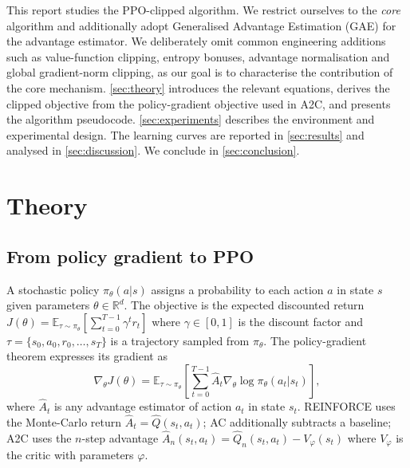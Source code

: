 \documentclass{article}
\theoremstyle{plain}
\theoremstyle{definition}
\theoremstyle{remark}
\begin{document}
This report studies the PPO-clipped algorithm. We restrict ourselves to the \emph{core} algorithm and additionally adopt Generalised Advantage Estimation (GAE) \cite{schulman2016gae} for the advantage estimator. We deliberately omit common engineering additions such as value-function clipping, entropy bonuses, advantage normalisation and global gradient-norm clipping, as our goal is to characterise the contribution of the core mechanism. \autoref{sec:theory} introduces the relevant equations, derives the clipped objective from the policy-gradient objective used in A2C, and presents the algorithm pseudocode. \autoref{sec:experiments} describes the environment and experimental design. The learning curves are reported in \autoref{sec:results} and analysed in \autoref{sec:discussion}. We conclude in \autoref{sec:conclusion}.

\section{Theory}\label{sec:theory}

\subsection{From policy gradient to PPO}\label{sec:theory:pg}

A stochastic policy $\pi_\theta(a|s)$ assigns a probability to each action $a$ in state $s$ given parameters $\theta\in\mathbb{R}^{d}$. The objective is the expected discounted return $J(\theta)=\mathbb{E}_{\tau\sim\pi_\theta}\!\left[\sum_{t=0}^{T-1}\gamma^t r_t\right]$ where $\gamma\in[0,1]$ is the discount factor and $\tau=\{s_0,a_0,r_0,\dots,s_T\}$ is a trajectory sampled from $\pi_\theta$. The policy-gradient theorem expresses its gradient as
\begin{equation}
    \nabla_\theta J(\theta) = \mathbb{E}_{\tau\sim\pi_\theta}\!\left[\sum_{t=0}^{T-1} \hat A_t \nabla_\theta \log\pi_\theta(a_t|s_t)\right],
    \label{eq:pg}
\end{equation}
where $\hat A_t$ is any advantage estimator of action $a_t$ in state $s_t$. REINFORCE uses the Monte-Carlo return $\hat A_t=\hat Q(s_t,a_t)$; AC additionally subtracts a baseline; A2C uses the $n$-step advantage $\hat A_n(s_t,a_t)=\hat Q_n(s_t,a_t)-V_\varphi(s_t)$ where $V_\varphi$ is the critic with parameters $\varphi$.
\end{document}
